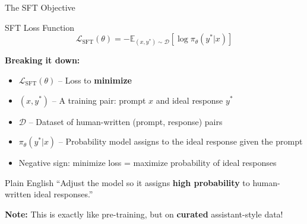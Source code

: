 \documentclass[aspectratio=169,11pt]{beamer}
\newcommand{\highlight}[1]{\textcolor{accentorange}{\textbf{#1}}}
\newcommand{\important}[1]{\textcolor{primaryblue}{\textbf{#1}}}
\begin{document}
\begin{frame}{The SFT Objective}
\begin{block}{SFT Loss Function}
\[
\mathcal{L}_{\text{SFT}}(\theta) = -\mathbb{E}_{(x, y^*) \sim \mathcal{D}} \left[ \log \pi_\theta(y^* | x) \right]
\]
\end{block}

\textbf{Breaking it down:}
\begin{itemize}
    \item $\mathcal{L}_{\text{SFT}}(\theta)$ -- Loss to \important{minimize}
    \item $(x, y^*)$ -- A training pair: prompt $x$ and ideal response $y^*$
    \item $\mathcal{D}$ -- Dataset of human-written (prompt, response) pairs
    \item $\pi_\theta(y^* | x)$ -- Probability model assigns to the ideal response given the prompt
    \item Negative sign: minimize loss = maximize probability of ideal responses
\end{itemize}

\vspace{0.3cm}
\begin{block}{Plain English}
``Adjust the model so it assigns \highlight{high probability} to human-written ideal responses.''
\end{block}

\textbf{Note:} This is exactly like pre-training, but on \important{curated} assistant-style data!
\end{frame}
\end{document}
